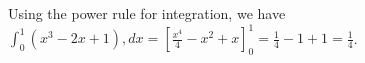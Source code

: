 Using the power rule for integration, we have $\int_{0}^{1} (x^3 - 2x + 1) , dx = \left[\frac{x^4}{4} - x^2 + x\right]_{0}^{1} = \frac{1}{4} - 1 + 1 = \frac{1}{4}$.
